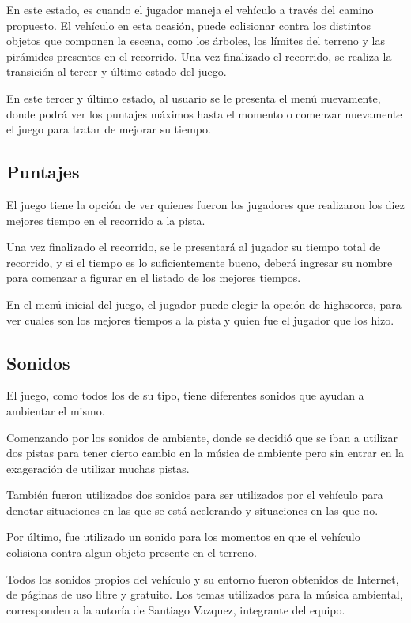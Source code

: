 \documentclass[a4paper,11pt]{article}
\begin{document}
En este estado, es cuando el jugador maneja el vehículo a través del camino
propuesto.  El vehículo en esta ocasión, puede colisionar contra los distintos
objetos que componen la escena, como los árboles, los límites del terreno y las
pirámides presentes en el recorrido.  Una vez finalizado el recorrido, se
realiza la transición al tercer y último estado del juego.

En este tercer y último estado, al usuario se le presenta el menú nuevamente,
donde podrá ver los puntajes máximos hasta el momento o comenzar nuevamente el
juego para tratar de mejorar su tiempo.

\subsection{Puntajes}
El juego tiene la opción de ver quienes fueron los jugadores que realizaron los
diez mejores tiempo en el recorrido a la pista.

Una vez finalizado el recorrido, se le presentará al jugador su tiempo total de
recorrido, y si el tiempo es lo suficientemente bueno, deberá ingresar su
nombre para comenzar a figurar en el listado de los mejores tiempos.

En el menú inicial del juego, el jugador puede elegir la opción de highscores,
para ver cuales son los mejores tiempos a la pista y quien fue el jugador que
los hizo.
\subsection{Sonidos}
El juego, como todos los de su tipo, tiene diferentes sonidos que ayudan a
ambientar el mismo.

Comenzando por los sonidos de ambiente, donde se decidió que se iban a utilizar
dos pistas para tener cierto cambio en la música de ambiente pero sin entrar en
la exageración de utilizar muchas pistas.

También fueron utilizados dos sonidos para ser utilizados por el vehículo para
denotar situaciones en las que se está acelerando y situaciones en las que no.

Por último, fue utilizado un sonido para los momentos en que el vehículo
colisiona contra algun objeto presente en el terreno.

Todos los sonidos propios del vehículo y su entorno fueron obtenidos de
Internet, de páginas de uso libre y gratuito.  Los temas utilizados para la
música ambiental, corresponden a la autoría de Santiago Vazquez, integrante del
equipo.
\end{document}
